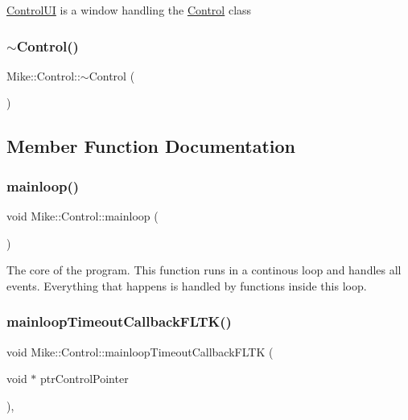 \hyperlink{class_control_u_i}{Control\+UI} is a window handling the \hyperlink{class_mike_1_1_control}{Control} class \mbox{\label{class_mike_1_1_control_aa3395e0509ab5b980732ab0e3a29ce4d}} 
\subsubsection{\texorpdfstring{$\sim$\+Control()}{~Control()}}
{\footnotesize\ttfamily Mike\+::\+Control\+::$\sim$\+Control (\begin{DoxyParamCaption}{ }\end{DoxyParamCaption})}



\subsection{Member Function Documentation}
\mbox{\label{class_mike_1_1_control_a3440083f03f7da3d4490fa44bc13d62b}} 
\subsubsection{\texorpdfstring{mainloop()}{mainloop()}}
{\footnotesize\ttfamily void Mike\+::\+Control\+::mainloop (\begin{DoxyParamCaption}{ }\end{DoxyParamCaption})\hspace{0.3cm}{\ttfamily [private]}}

The core of the program. This function runs in a continous loop and handles all events. Everything that happens is handled by functions inside this loop. \mbox{\label{class_mike_1_1_control_ac627d3cc73f39181fbfabfa01eb47f85}} 
\subsubsection{\texorpdfstring{mainloop\+Timeout\+Callback\+F\+L\+T\+K()}{mainloopTimeoutCallbackFLTK()}}
{\footnotesize\ttfamily void Mike\+::\+Control\+::mainloop\+Timeout\+Callback\+F\+L\+TK (\begin{DoxyParamCaption}\item[{void $\ast$}]{ptr\+Control\+Pointer }\end{DoxyParamCaption})\hspace{0.3cm}{\ttfamily [static]}, {\ttfamily [private]}}

